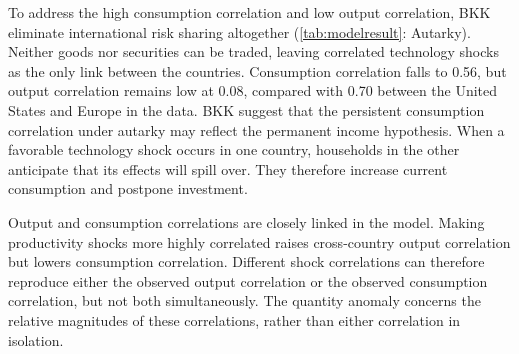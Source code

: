 To address the high consumption correlation and low output correlation, BKK eliminate international risk sharing altogether (\cref{tab:modelresult}: Autarky). Neither goods nor securities can be traded, leaving correlated technology shocks as the only link between the countries. Consumption correlation falls to 0.56, but output correlation remains low at 0.08, compared with 0.70 between the United States and Europe in the data. BKK suggest that the persistent consumption correlation under autarky may reflect the permanent income hypothesis. When a favorable technology shock occurs in one country, households in the other anticipate that its effects will spill over. They therefore increase current consumption and postpone investment.

Output and consumption correlations are closely linked in the model. Making productivity shocks more highly correlated raises cross-country output correlation but lowers consumption correlation. Different shock correlations can therefore reproduce either the observed output correlation or the observed consumption correlation, but not both simultaneously. The quantity anomaly concerns the relative magnitudes of these correlations, rather than either correlation in isolation.